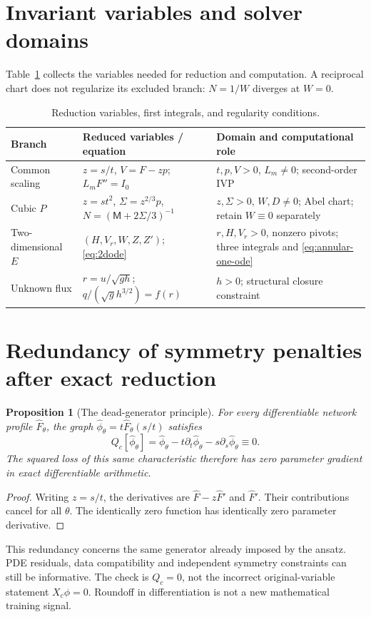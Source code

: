\documentclass[11pt,a4paper,oneside]{report}
\numberwithin{equation}{chapter}
\newtheorem{proposition}[theorem]{Proposition}
\begin{document}
\section{Invariant variables and solver domains}
Table~\ref{tab:invariants} collects the variables needed for reduction and computation. A reciprocal chart does not regularize its excluded branch: $N=1/W$ diverges at $W=0$.
\begin{table}[!htbp]\centering\small
\begin{tabularx}{\textwidth}{@{}p{}XX@{}}\toprule
Branch & Reduced variables / equation & Domain and computational role\\\midrule
Common scaling & $z=s/t$, $V=F-zp$; $L_mF''=I_0$ & $t,p,V>0$, $L_m\ne0$; second-order IVP\\
Cubic $P$ & $z=st^2$, $\Sigma=z^{2/3}p$, $N=(\mathsf M+2\Sigma/3)^{-1}$ & $z,\Sigma>0$, $W,D\ne0$; Abel chart; retain $W\equiv0$ separately\\
Two-dimensional $E$ & $(H,V_r,W,Z,Z')$; \eqref{eq:2dode} & $r,H,V_r>0$, nonzero pivots; three integrals and \eqref{eq:annular-one-ode}\\
Unknown flux & $r=u/\sqrt{gh}$; $q/(\sqrt g h^{3/2})=f(r)$ & $h>0$; structural closure constraint\\\bottomrule
\end{tabularx}
\caption{Reduction variables, first integrals, and regularity conditions.}\label{tab:invariants}
\end{table}

\section{Redundancy of symmetry penalties after exact reduction}
\begin{proposition}[The dead-generator principle]\label{prop:dead-generator}
For every differentiable network profile $\widehat F_\theta$, the graph
$\widehat\phi_\theta=t\widehat F_\theta(s/t)$ satisfies
\begin{equation}\label{eq:dead-generator}
Q_c[\widehat\phi_\theta]=\widehat\phi_\theta
-t\partial_t\widehat\phi_\theta-s\partial_s\widehat\phi_\theta\equiv0.
\end{equation}
The squared loss of this same characteristic therefore has zero parameter
gradient in exact differentiable arithmetic.
\end{proposition}
\begin{proof}
Writing $z=s/t$, the derivatives are $\widehat F-z\widehat F'$ and
$\widehat F'$. Their contributions cancel for all $\theta$. The identically
zero function has identically zero parameter derivative.
\end{proof}
This redundancy concerns the same generator already imposed by the ansatz.
PDE residuals, data compatibility and independent symmetry constraints can
still be informative. The check is $Q_c=0$, not the incorrect
original-variable statement $X_c\phi=0$.
Roundoff in differentiation is not a new mathematical training signal.
\end{document}
